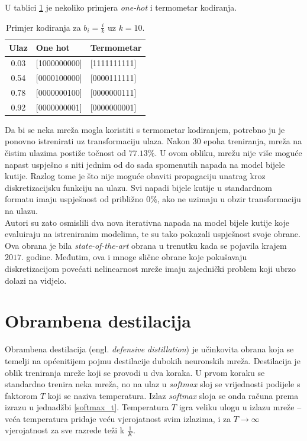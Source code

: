 \documentclass[utf8, diplomski]{fer}
\begin{document}
U tablici \ref{example_encoding} je nekoliko primjera \textit{one-hot} i termometar kodiranja.
\begin{table}[H]
\centering
\begin{tabular}{@{}cll@{}}
\toprule
Ulaz & One hot & Termometar\\ \midrule
0.03 & [1000000000] & [1111111111] \\
0.54 & [0000100000] & [0000111111] \\ 
0.78 & [0000000100] & [0000000111] \\ 
0.92 & [0000000001] & [0000000001] \\ \bottomrule
\end{tabular}
\caption{Primjer kodiranja za $b_{i} = \frac{i}{k}$ uz $k = 10$.}\label{example_encoding}
\end{table}
\par
Da bi se neka mreža mogla koristiti s termometar kodiranjem, potrebno ju je ponovno istrenirati uz transformaciju ulaza. Nakon $30$ epoha treniranja, mreža na čistim ulazima postiže točnost od $77.13\%$. U ovom obliku, mrežu nije više moguće napast uspješno s niti jednim od do sada spomenutih napada na model bijele kutije. Razlog tome je što nije moguće obaviti propagaciju unatrag kroz diskretizacijsku funkciju na ulazu. Svi napadi bijele kutije u standardnom formatu imaju uspješnost od približno $0\%$, ako ne uzimaju u obzir transformaciju na ulazu. \\
Autori su zato osmislili dva nova iterativna napada na model bijele kutije koje evaluiraju na istreniranim modelima, te su tako pokazali uspješnost svoje obrane. Ova obrana je bila \textit{state-of-the-art} obrana u trenutku kada se pojavila krajem $2017.$ godine. Međutim, ova i mnoge slične obrane koje pokušavaju diskretizacijom povećati nelinearnost mreže imaju zajednički problem koji ubrzo dolazi na vidjelo.

\section{Obrambena destilacija}
Obrambena destilacija (engl. \textit{defensive distillation}) je učinkovita obrana koja se temelji na općenitijem pojmu destilacije dubokih neuronskih mreža. Destilacija je oblik treniranja mreže koji se provodi u dva koraka. U prvom koraku se standardno trenira neka mreža, no na ulaz u \textit{softmax} sloj se vrijednosti podijele s faktorom $T$ koji se naziva temperatura. Izlaz \textit{softmax} sloja se onda računa prema izrazu u jednadžbi \ref{softmax_t}. Temperatura $T$ igra veliku ulogu u izlazu mreže -- veća temperatura pridaje veću vjerojatnost svim izlazima, i za $T \rightarrow \infty$ vjerojatnost za sve razrede teži k $\frac{1}{K}$. \par
\end{document}
